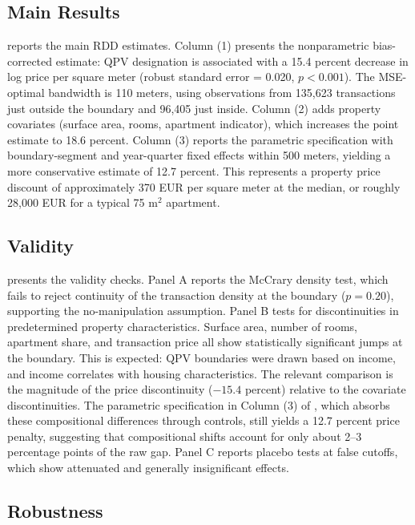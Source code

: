 \documentclass[12pt]{article}
\begin{document}
\subsection{Main Results}

 reports the main RDD estimates. Column (1) presents the nonparametric bias-corrected estimate: QPV designation is associated with a 15.4 percent decrease in log price per square meter (robust standard error = 0.020, $p < 0.001$). The MSE-optimal bandwidth is 110 meters, using observations from 135,623 transactions just outside the boundary and 96,405 just inside. Column (2) adds property covariates (surface area, rooms, apartment indicator), which increases the point estimate to 18.6 percent. Column (3) reports the parametric specification with boundary-segment and year-quarter fixed effects within 500 meters, yielding a more conservative estimate of 12.7 percent. This represents a property price discount of approximately 370 EUR per square meter at the median, or roughly 28,000 EUR for a typical 75 m$^2$ apartment.



\subsection{Validity}

 presents the validity checks. Panel A reports the McCrary density test, which fails to reject continuity of the transaction density at the boundary ($p = 0.20$), supporting the no-manipulation assumption. Panel B tests for discontinuities in predetermined property characteristics. Surface area, number of rooms, apartment share, and transaction price all show statistically significant jumps at the boundary. This is expected: QPV boundaries were drawn based on income, and income correlates with housing characteristics. The relevant comparison is the magnitude of the price discontinuity ($-15.4$ percent) relative to the covariate discontinuities. The parametric specification in Column (3) of , which absorbs these compositional differences through controls, still yields a 12.7 percent price penalty, suggesting that compositional shifts account for only about 2--3 percentage points of the raw gap. Panel C reports placebo tests at false cutoffs, which show attenuated and generally insignificant effects.



\subsection{Robustness}
\end{document}
